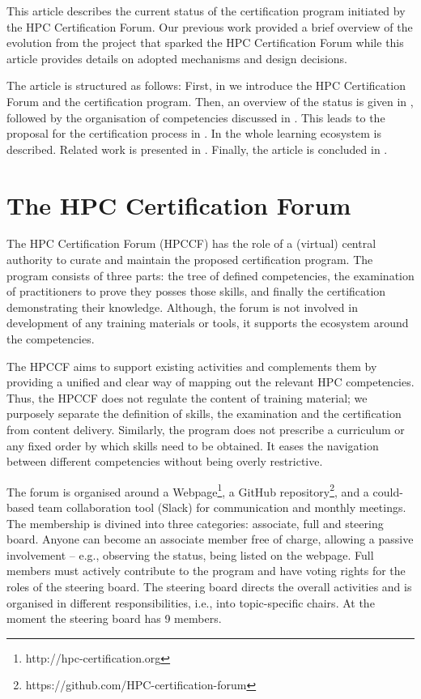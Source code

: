 \documentclass[jocse]{jocseart}
\begin{document}
This article describes the current status of the certification program initiated by the HPC Certification Forum.
Our previous work provided a brief overview of the evolution from the project that sparked the HPC Certification Forum \cite{TAHCPKHHSS19} while this article provides details on adopted mechanisms and design decisions.

The article is structured as follows:
First, in  we introduce the HPC Certification Forum and the certification program.
Then, an overview of the status is given in , followed by the organisation of competencies discussed in .
This leads to the proposal for the certification process in .
In  the whole learning ecosystem is described.
Related work is presented in .
Finally, the article is concluded in .

\section{The HPC Certification Forum}
\label{sec:forum}

The HPC Certification Forum (HPCCF) has the role of a (virtual) central authority to curate and maintain the proposed certification program.
The program consists of three parts: the tree of defined competencies, the examination of practitioners to prove they posses those skills, and finally the certification demonstrating their knowledge.
Although, the forum is not involved in development of any training materials or tools, it supports the ecosystem around the competencies.

The HPCCF aims to support existing activities and complements them by providing a unified and clear way of mapping out the relevant HPC competencies.
Thus, the HPCCF does not regulate the content of training material; we purposely separate the definition of skills, the examination and the certification from content delivery.
Similarly, the program does not prescribe a curriculum or any fixed order by which skills need to be obtained. It eases the navigation between different competencies without being overly restrictive.

The forum is organised around a Webpage\footnote{http://hpc-certification.org},  a GitHub repository\footnote{https://github.com/HPC-certification-forum},  and a could-based team collaboration tool (Slack) for communication and monthly meetings.
The membership is divined into three categories: associate, full and steering board.
Anyone can become an associate member free of charge, allowing a passive involvement -- e.g., observing the status, being listed on the webpage.
Full members must actively contribute to the program and have voting rights for the roles of the steering board.
The steering board directs the overall activities and is organised in different responsibilities, i.e., into topic-specific chairs. At the moment the steering board has 9 members.
\end{document}

